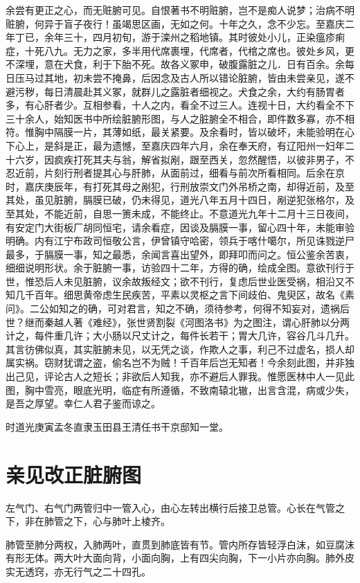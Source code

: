 \documentclass[a4paper,12pt,UTF8,twoside]{ctexbook}
\begin{document}
	余尝有更正之心，而无赃腑可见。自恨著书不明赃腑，岂不是痴人说梦；治病不明赃腑，何异于盲子夜行！虽竭思区画，无如之何。十年之久，念不少忘。至嘉庆二年丁已，余年三十，四月初旬，游于滦州之稻地镇。其时彼处小儿，正染瘟疹痢症，十死八九。无力之家，多半用代席裹埋，代席者，代棺之席也。彼处乡风，更不深埋，意在犬食，利于下胎不死。故各义冢申，破腹露脏之儿．日有百余。余每日压马过其地，初未尝不掩鼻，后因念及古人所以错论脏腑，皆由未尝亲见，遂不避污秽，每日清晨赴其义冢，就群儿之露脏者细视之。犬食之余，大约有肠胃者多，有心肝者少。互相参看，十人之内，看全不过三人。连视十日，大约看全不下三十余人，始知医书中所绘脏腑形图，与人之脏腑全不相合，即件数多寡，亦不相符。惟胸中隔膜一片，其薄如纸，最关紧要。及余看时，皆以破坏，未能验明在心下心上，是斜是正，最为遗憾，至嘉庆四年六月，余在奉天府，有辽阳州一妇年二十六岁，因疯疾打死其夫与翁，解省拟剐，跟至西关，忽然醒悟，以彼非男子，不忍近前，片刻行刑者提其心与肝肺，从面前过，细看与前次所看相同。后余在京时，嘉庆庚辰年，有打死其母之剐犯，行刑放崇文门外吊桥之南，却得近前，及至其处，虽见脏腑，膈膜已破，仍未得见，道光八年五月十四日，剐逆犯张格尔，及至其处，不能近前，自思一箦未成，不能终止。不意道光九年十二月十三日夜间，有安定门大街板厂胡同恒宅，请余看症，因谈及膈膜一事，留心四十年，未能审验明确。内有江宁布政司恒敬公言，伊曾镇守哈密，领兵于喀什噶尔，所见诛戮逆尸最多，于膈膜一事，知之最悉，余闻言喜出望外，即拜叩而问之。恒公鉴余苦衷，细细说明形状。余于脏腑一事，访验四十二年，方得的确，绘成全图。意欲刊行于世，惟恐后人未见脏腑，议余故叛经文；欲不刊行，复虑后世业医受祸，相沿又不知几千百年。细思黄帝虑生民疾苦，平素以灵枢之言下间歧伯、鬼臾区，故名《素问》。二公如知之的确，可对君言，知之不确，须待参考，何得不知妄对，遗祸后世？继而秦越人著《难经》，张世贤割裂《河图洛书》为之图注，谓心肝肺以分两计之，每件重几许；大小肠以尺丈计之，每件长若干；胃大几许，容谷几斗几升。其言彷佛似真，其实脏腑未见，以无凭之谈，作欺人之事，利己不过虚名，损人却属实祸。窃财犹谓之盗，偷名岂不为贼！千百年后岂无知者！今余刻此图，并非独出己见，评论古人之短长；非欲后人知我，亦不避后人罪我。惟愿医林中人一见此图，胸中雪亮，眼底光明，临症有所遵循，不致南辕北辙，出言含混，病或少失，是吾之厚望。幸仁人君子鉴而谅之。
	
	时道光庚寅孟冬直隶玉田县王清任书干京邸知一堂。
	
	\chapter{亲见改正脏腑图}
	左气门、右气门两管归中一管入心，由心左转出横行后接卫总管。心长在气管之下，非在肺管之下，心与肺叶上棱齐。
	
	肺管至肺分两权，入肺两叶，直贯到肺底皆有节。管内所存皆轻浮白沫，如豆腐沫有形无体。两大叶大面向背，小面向胸，上有四尖向胸，下一小片亦向胸。肺外皮实无透窍，亦无行气之二十四孔。
	
\end{document}
